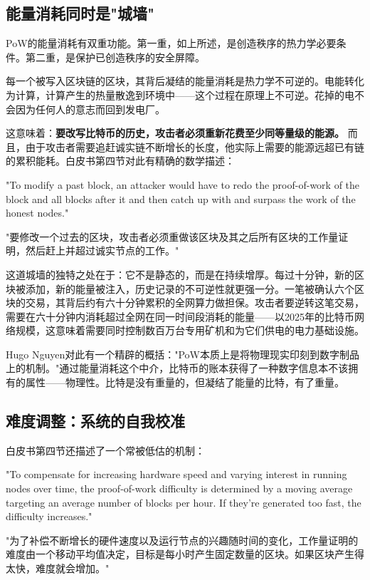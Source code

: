 \documentclass[a4paper,12pt,openany]{ctexbook}
\newenvironment{quoting}{%
  \par\vspace{0.5em}%
  \begin{list}{}{%
    \setlength{\leftmargin}{2em}%
    \setlength{\rightmargin}{2em}%
    \setlength{\parsep}{0.3em}%
    \setlength{\itemsep}{0pt}%
    \setlength{\topsep}{0pt}%
  }%
  \item\relax
}{%
  \end{list}%
  \par\vspace{0.5em}%
}
\begin{document}
\subsection*{能量消耗同时是"城墙"}


PoW的能量消耗有双重功能。第一重，如上所述，是创造秩序的热力学必要条件。第二重，是保护已创造秩序的安全屏障。

每一个被写入区块链的区块，其背后凝结的能量消耗是热力学不可逆的。电能转化为计算，计算产生的热量散逸到环境中——这个过程在原理上不可逆。花掉的电不会因为任何人的意志而回到发电厂。

这意味着：\textbf{要改写比特币的历史，攻击者必须重新花费至少同等量级的能源。} 而且，由于攻击者需要追赶诚实链不断增长的长度，他实际上需要的能源远超已有链的累积能耗。白皮书第四节对此有精确的数学描述：


\begin{quoting}
\small
"To modify a past block, an attacker would have to redo the proof-of-work of the block and all blocks after it and then catch up with and surpass the work of the honest nodes."

"要修改一个过去的区块，攻击者必须重做该区块及其之后所有区块的工作量证明，然后赶上并超过诚实节点的工作。"
\end{quoting}


这道城墙的独特之处在于：它不是静态的，而是在持续增厚。每过十分钟，新的区块被添加，新的能量被注入，历史记录的不可逆性就更强一分。一笔被确认六个区块的交易，其背后约有六十分钟累积的全网算力做担保。攻击者要逆转这笔交易，需要在六十分钟内消耗超过全网在同一时间段消耗的能量——以2025年的比特币网络规模，这意味着需要同时控制数百万台专用矿机和为它们供电的电力基础设施。

Hugo Nguyen对此有一个精辟的概括："PoW本质上是将物理现实印刻到数字制品上的机制。"通过能量消耗这个中介，比特币的账本获得了一种数字信息本不该拥有的属性——物理性。比特是没有重量的，但凝结了能量的比特，有了重量。


\subsection*{难度调整：系统的自我校准}


白皮书第四节还描述了一个常被低估的机制：


\begin{quoting}
\small
"To compensate for increasing hardware speed and varying interest in running nodes over time, the proof-of-work difficulty is determined by a moving average targeting an average number of blocks per hour. If they're generated too fast, the difficulty increases."

"为了补偿不断增长的硬件速度以及运行节点的兴趣随时间的变化，工作量证明的难度由一个移动平均值决定，目标是每小时产生固定数量的区块。如果区块产生得太快，难度就会增加。"
\end{quoting}
\end{document}
